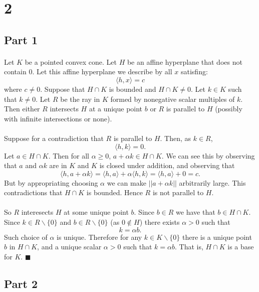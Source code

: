 \documentclass[letterpaper,12pt,oneside,onecolumn]{article}
\begin{document}
\section*{2}
\subsection*{Part 1}
\paragraph{}
Let $K$ be a pointed convex cone. Let $H$ be an affine hyperplane that does not contain $0$. Let this affine hyperplane we describe by all $x$ satisfing:
$$\langle h, x \rangle = c $$ where $c \neq 0$. Suppose that $H\cap K$ is bounded and $H \cap K \neq 0$. Let $k \in K$ such that $k \neq 0$. Let $R$ be the ray in $K$ formed by nonegative scalar multiples of $k$. Then either $R$ intersects $H$ at a unique point $b$ or $R$ is parallel to $H$ (possibly with infinite intersections or none).
\paragraph{}
Suppose for a contradiction that $R$ is parallel to $H$. Then, as $k \in R$,
$$\langle h, k \rangle = 0.$$
Let $a \in H \cap K$. Then for all $\alpha \geq 0$, $a + \alpha k \in H \cap K$. We can see this by observing that $a$ and $\alpha k$ are in $K$ and $K$ is closed under addition, and observing that
$$\langle h, a + \alpha k \rangle = \langle h, a \rangle + \alpha \langle h, k \rangle = \langle h, a \rangle + 0 = c.$$
But by appropriating choosing $\alpha$ we can make $|| a+ \alpha k||$ arbitrarily large. This contradictions that $H\cap K$ is bounded. Hence $R$ is not parallel to $H$.
\paragraph{}
So $R$ interesects $H$ at some unique point $b$. Since $b \in R$ we have that $b \in H \cap K$. Since $k \in R \backslash\{0\}$ and $b \in R \backslash \{0\}$ (as $0\not\in H$) there exists $\alpha > 0$ such that $$k = \alpha b.$$
Such choice of $\alpha$ is unique. Therefore for any $k \in K \backslash\{0\}$ there is a unique point $b$ in $H \cap K$, and a unique scalar $\alpha > 0$ such that $k = \alpha b$. That is, $H \cap K$ is a base for $K$. $\blacksquare$
\subsection*{Part 2}
\end{document}

